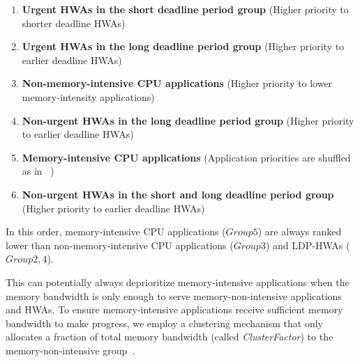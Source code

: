 \documentclass[10pt,letterpaper]{article}
\newif\ifOPTION
\begin{document}
\begin{enumerate}
\item
\textbf{Urgent HWAs in the short deadline period group} (Higher
priority to shorter deadline HWAs)
\item
\textbf{Urgent HWAs in the long deadline period group} (Higher
priority to earlier deadline HWAs)
\item
\textbf{Non-memory-intensive CPU applications} (Higher priority to
lower memory-intensity applications)
\item
\textbf{Non-urgent HWAs in the long deadline period group} (Higher
priority to earlier deadline HWAs)
\item
\textbf{Memory-intensive CPU applications} (Application priorities are
shuffled as in ~\cite{tcm})
\item
\textbf{Non-urgent HWAs in the short and long deadline period group}
(Higher priority to earlier deadline HWAs)
\end{enumerate}

\ifOPTION
The current scheduling order allows HWAs to receive high priority when they
becomes urgent (i.e., not meeting their expected progress). This prevents them 
from missing deadlines due to interference from CPU applications. Memory-intensive CPU applications
($Group5$) are always ranked lower than memory-non-intensive CPU applications
($Group3$) and LDP-HWAs ($Group2,4$).
\else
In this order, memory-intensive CPU applications
($Group5$) are always ranked lower than non-memory-intensive CPU applications
($Group3$) and LDP-HWAs ($Group2,4$). 
\fi
This can potentially always deprioritize memory-intensive
applications when the memory bandwidth is only enough to serve memory-non-intensive
applications and HWAs. To ensure memory-intensive applications receive sufficient memory
bandwidth to make progress, we employ a clustering mechanism that only allocates
a fraction of total memory bandwidth (called \emph{ClusterFactor}) to the memory-non-intensive 
group~\cite{tcm}.
\end{document}
